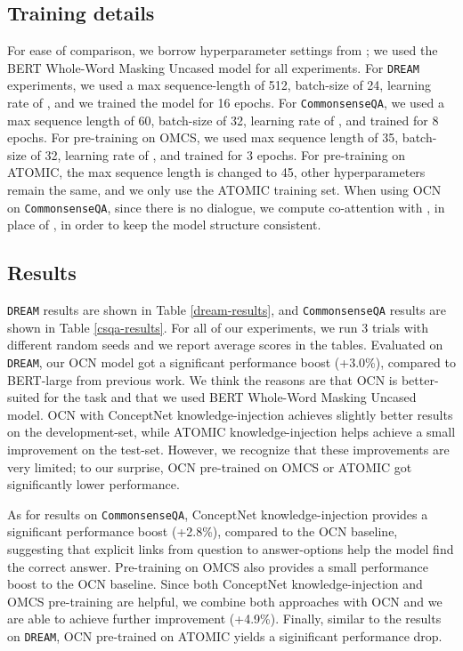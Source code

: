 \documentclass[11pt,a4paper]{article}
\begin{document}
\subsection{Training details}
For ease of comparison, we borrow hyperparameter settings from \citet{pan2019improving}; we used the BERT Whole-Word Masking Uncased model \cite{devlin2018bert} for all experiments. For \texttt{DREAM} experiments, we used a max sequence-length of 512, batch-size of 24, learning rate of , and we trained the model for 16 epochs. For \texttt{CommonsenseQA}, we used a max sequence length of 60, batch-size of 32, learning rate of , and trained for 8 epochs. For pre-training on OMCS, we used max sequence length of 35, batch-size of 32, learning rate of , and trained for 3 epochs. For pre-training on ATOMIC, the max sequence length is changed to 45, other hyperparameters remain the same, and we only use the ATOMIC training set. When using OCN on \texttt{CommonsenseQA}, since there is no dialogue, we compute co-attention with , in place of , in order to keep the model structure consistent.

\subsection{Results}
\texttt{DREAM} results are shown in Table \ref{dream-results}, and \texttt{CommonsenseQA} results are shown in Table \ref{csqa-results}. For all of our experiments, we run 3 trials with different random seeds and we report average scores in the tables. Evaluated on \texttt{DREAM}, our OCN model got a significant performance boost (+3.0\%), compared to BERT-large from previous work. We think the reasons are that OCN is better-suited for the task and that we used BERT Whole-Word Masking Uncased model. OCN with ConceptNet knowledge-injection achieves slightly better results on the development-set, while ATOMIC knowledge-injection helps achieve a small improvement on the test-set. However, we recognize that these improvements are very limited; to our surprise, OCN pre-trained on OMCS or ATOMIC got significantly lower performance.

As for results on \texttt{CommonsenseQA}, ConceptNet knowledge-injection provides a significant performance boost (+2.8\%), compared to the OCN baseline, suggesting that explicit links from question to answer-options help the model find the correct answer.
Pre-training on OMCS also provides a small performance boost to the OCN baseline. Since both ConceptNet knowledge-injection and OMCS pre-training are helpful, we combine both approaches with OCN and we are able to achieve further improvement (+4.9\%).  Finally, similar to the results on \texttt{DREAM}, OCN pre-trained on ATOMIC yields a siginificant performance drop.
\end{document}
